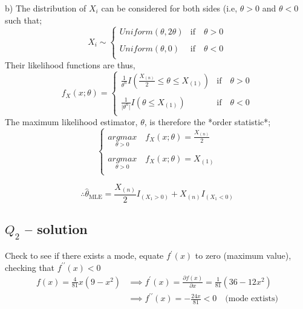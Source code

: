 \documentclass[12pt,a4paper, fleq]{article}
\begin{document}
b)
The distribution of $X_i$ can be considered for both sides (i.e, $\theta >0$ and $\theta <0$ such that;
\begin{equation*}
X_i \sim 
\begin{cases}
Uniform(\theta, 2\theta) & \mbox{if}\quad \theta > 0\\
\\
Uniform(\theta, 0) & \mbox{if}\quad \theta  < 0\\
\end{cases}
\end{equation*}
Their likelihood functions are thus,
\begin{equation*}
f_X(x;\theta) = 
\begin{cases}
\frac{1}{\theta^n} I\left(\frac{X_{(n)}}{2} \le \theta \le X_{(1)}\right) & \mbox{if}\quad \theta  > 0\\
\\
\frac{1}{\vert\theta^n\vert} I\left(\theta \le X_{(1)}\right) & \mbox{if}\quad \theta  < 0\\
\end{cases}
\end{equation*}
The maximum likelihood estimator, $\theta$,  is therefore the *order statistic*;
\begin{equation*}
\begin{cases}
\underset{\theta > 0}{argmax} \quad f_X(x;\theta) = \frac{X_{(n)}}{2}\\
\\
\underset{\theta > 0}{argmax} \quad f_X(x;\theta) = X_{(1)}\\
\end{cases}
\end{equation*}

\begin{equation*}
\therefore \hat{\theta}_{\mbox{MLE}} = \frac{X_{(n)}}{2} I_{(X_1 > 0)} + X_{(n)} I_{(X_1 < 0)}  
\end{equation*}

\subsection*{$Q_{2}$ -- solution}
Check to see if there exists a mode, equate $f^\prime(x)$ to zero (maximum value), checking that $f^{\prime\prime}(x) < 0$
\begin{equation*}
\begin{split}
f(x) = \frac{4}{81}x(9-x^2) & \implies f^\prime(x) =  \frac{\partial f(x)}{\partial x} = \frac{1}{81}(36 - 12x^2)\\
&\implies  f^{\prime\prime}(x) = -\frac{ 24x}{81} < 0\quad \mbox{(mode extists)}\\
\end{split}
\end{equation*}
\end{document}
